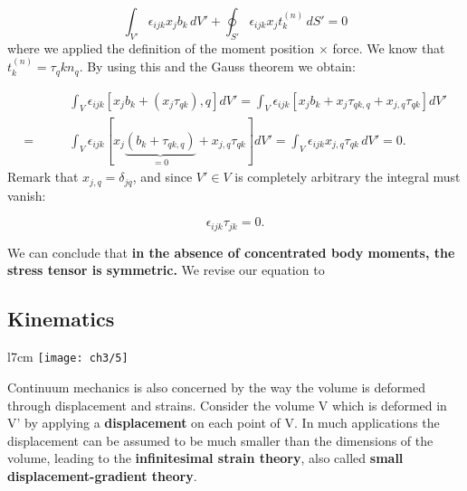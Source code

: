 			\begin{equation}
			\int _{V'} \epsilon _{ijk} x_j b_k\, dV' + \oint _{S'}\epsilon _{ijk} x_j t^{(n)}_k \, dS' = 0 
			\end{equation}
			where we applied the definition of the moment position $\times$ force. We know that $t^{(n)}_k = \tau _qk n_q$. By using this and the Gauss theorem we obtain:
			
			\begin{equation}
			\begin{aligned}
			&\int _V \epsilon _{ijk}\left[ x_j b_k + (x_j \tau _{qk}),q\right] dV' = \int _V \epsilon _{ijk}\left[ x_j b_k + x_j \tau _{qk,q} +x_{j,q} \tau _{qk} \right] dV'\\
			=\qquad &\int _V \epsilon _{ijk}\left[ x_j\underbrace{(b_k + \tau _{qk,q})}_{=0} +x_{j,q} \tau _{qk} \right] dV' = \int _V \epsilon _{ijk} x_{j,q} \tau _{qk} \, dV' = 0.
			\end{aligned}
			\end{equation}
			 Remark that $x_{j,q} = \delta _{jq}$, and since $V'\in V$ is completely arbitrary the integral must vanish:
			 
			 \begin{equation}
			 \epsilon _{ijk} \tau _{jk}= 0.
			 \end{equation}
			 
			 We can conclude that \textbf{in the absence of concentrated body moments, the stress tensor is symmetric.} We revise our equation to
			 
			 \begin{center}
			 \end{center}
			 
		\subsection{Kinematics}
			\begin{wrapfigure}[9]{l}{7cm}
			\vspace{-5mm}	
			\texttt{[image: ch3/5]}
			\end{wrapfigure}		
			Continuum mechanics is also concerned by the way the volume is deformed through displacement and strains. Consider the volume V which is deformed in V' by applying a \textbf{displacement} on each point of V. In much applications the displacement can be assumed to be much smaller than the dimensions of the volume, leading to the \textbf{infinitesimal strain theory}, also called \textbf{small displacement-gradient theory}. \newpage 
			
